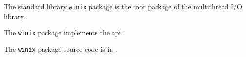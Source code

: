 
The standard library {\tt winix} package is the root package of the multithread I/O library.

The {\tt winix} package implements the  api.

The {\tt winix} package source code is in .


